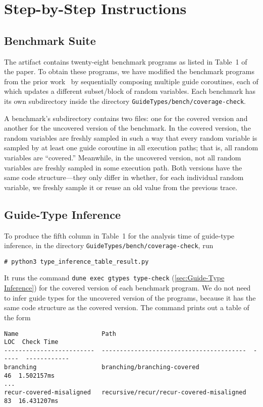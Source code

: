 
\section{Step-by-Step Instructions}

\subsection{Benchmark Suite}

The artifact contains twenty-eight benchmark programs as listed in Table~1 of the paper.
%
To obtain these programs, we have modified the benchmark programs from the prior
work~\citep{PLDI:WHR21B} by sequentially composing multiple guide coroutines,
each of which updates a different subset/block of random variables.
%
Each benchmark has its own subdirectory inside the directory
\texttt{GuideTypes/bench/coverage-check}.

A benchmark's subdirectory contains two files: one for the covered version and
another for the uncovered version of the benchmark.
%
In the covered version, the random variables are freshly sampled in such a way
that every random variable is sampled by at least one guide coroutine in all
execution paths; that is, all random variables are ``covered.''
%
Meanwhile, in the uncovered version, not all random variables are freshly
sampled in some execution path.
%
Both versions have the same code structure---they only differ in whether, for
each individual random variable, we freshly sample it or reuse an old value from
the previous trace.

\subsection{Guide-Type Inference}

To produce the fifth column in Table~1 for the analysis time of guide-type
inference, in the directory \texttt{GuideTypes/bench/coverage-check}, run
\begin{verbatim}
# python3 type_inference_table_result.py 
\end{verbatim}
%
It runs the command \texttt{dune exec gtypes type-check} (\cref{sec:Guide-Type
Inference}) for the covered version of each benchmark program.
%
We do not need to infer guide types for the uncovered version of the programs,
because it has the same code structure as the covered version.
%
The command prints out a table of the form
\begin{verbatim}
Name                       Path                                        LOC  Check Time
-------------------------  ----------------------------------------  -----  ------------
branching                  branching/branching-covered                  46  1.502157ms
...
recur-covered-misaligned   recursive/recur/recur-covered-misaligned     83  16.431207ms
\end{verbatim}

